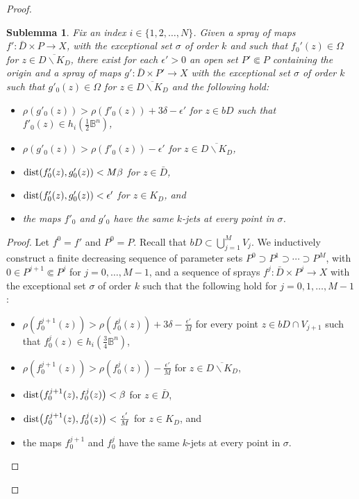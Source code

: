 \documentclass[11pt]{amsart}
\numberwithin{equation}{section}
\newtheorem{sublemma}[theorem]{Sublemma}
\theoremstyle{definition}
\begin{document}
\begin{proof}
\begin{sublemma} 
\label{sublemma}
Fix an index $i\in\{1,2,\ldots, N\}$.
Given a spray of maps $f'\colon\bar D\times P\to X$,  
with the exceptional set $\sigma$ of order $k$ and such that
$f_0'(z)\in\Omega$ for $z\in \overline{D{\backslash} K_D}$, there exist
for each ${\epsilon}'>0$ an open set $P' {\Subset} P$ containing the origin 
and a spray of maps $g'\colon\bar D\times P'\to X$ 
with the exceptional set $\sigma$ of order $k$ such that
$g'_0(z)\in \Omega$ for $z\in \overline{D{\backslash} K_D}$ and
the following hold:
\begin{itemize}
\item[(i')] $\rho(g'_0(z))>\rho(f'_0(z))+ 3{\delta}-{\epsilon}'$   
for $z\in bD$ such that $f'_0(z)\in h_i(\tfrac 12{\mathbb{B}}^n)$,
\item[(ii')] $\rho(g'_0(z))>\rho(f'_0(z))-{\epsilon}'$ for $z\in \overline{D{\backslash} K_D}$,
\item[(iii')] ${\rm dist }(f'_0(z),g'_0(z))<M\beta$ for $z\in \bar D$, 
\item[(iv')] ${\rm dist }(f'_0(z),g'_0(z))<{\epsilon}'$ for $z\in K_D$, and
\item[(v')] the maps $f'_0$ and $g'_0$ have the same $k$-jets at every point in $\sigma$.
\end{itemize}
\end{sublemma}

\begin{proof}
Let $f^0=f'$ and $P^0=P$.  Recall that $bD\subset \bigcup_{j=1}^M V_j$.
We inductively construct a finite decreasing 
sequence of parameter sets $P^0\supset P^1\supset \cdots\supset P^M$,
with $0\in P^{j+1}{\Subset} P^{j}$ for $j=0,\ldots,M-1$, and a sequence of
sprays $f^j\colon\bar D\times P^j\to X$ with the exceptional set $\sigma$ 
of order $k$ such that the following hold for $j=0,1,\ldots,M-1$:
\begin{itemize}
\item[(i$^\dagger$)] $\rho(f^{j+1}_0(z))>\rho(f^j_0(z))+3{\delta}-\tfrac{{\epsilon}'}M$        
for every point $z\in bD\cap V_{j+1}$ such that $f^j_0(z)\in h_i(\tfrac 34{\mathbb{B}}^n)$,
\item[(ii$^\dagger$)] $\rho(f^{j+1}_0(z))>\rho(f^{j}_0(z))-\tfrac{{\epsilon}'}M$ for $z\in \overline{D{\backslash} K_D}$,
\item[(iii$^\dagger$)] ${\rm dist }\bigl(f^{j+1}_0(z),f^{j}_0(z)\bigr) <{\beta}$ for $z\in \bar D$,
\item[(iv$^\dagger$)] ${\rm dist }\bigl(f^{j+1}_0(z),f^{j}_0(z)\bigr) < \tfrac{{\epsilon}'}M$ for $z\in K_D$, and
\item[(v$^\dagger$)] the maps $f^{j+1}_0$ and $f^{j}_0$ 
have the same $k$-jets at every point in $\sigma$.
\end{itemize}


\end{proof}
\end{proof}
\end{document}
